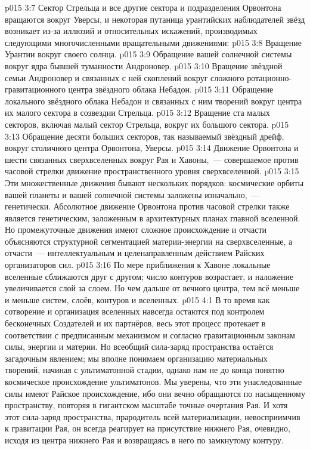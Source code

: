 \vs p015 3:7 \pc Сектор Стрельца и все другие сектора и подразделения Орвонтона вращаются вокруг Уверсы, и некоторая путаница урантийских наблюдателей звёзд возникает из\hyp{}за иллюзий и относительных искажений, производимых следующими многочисленными вращательными движениями:
\vs p015 3:8 Вращение Урантии вокруг своего солнца.
\vs p015 3:9 Обращение вашей солнечной системы вокруг ядра бывшей туманности Андроновер.
\vs p015 3:10 Вращение звёздной семьи Андроновер и связанных с ней скоплений вокруг сложного ротационно\hyp{}гравитационного центра звёздного облака Небадон.
\vs p015 3:11 Обращение локального звёздного облака Небадон и связанных с ним творений вокруг центра их малого сектора в созвездии Стрельца.
\vs p015 3:12 Вращение ста малых секторов, включая малый сектор Стрельца, вокруг их большого сектора.
\vs p015 3:13 Обращение десяти больших секторов, так называемый звёздный дрейф, вокруг столичного центра Орвонтона, Уверсы.
\vs p015 3:14 Движение Орвонтона и шести связанных сверхвселенных вокруг Рая и Хавоны,~--- совершаемое против часовой стрелки движение пространственного уровня сверхвселенной.
\vs p015 3:15 \pc Эти множественные движения бывают нескольких порядков: космические орбиты вашей планеты и вашей солнечной системы заложены изначально,~--- генетически. Абсолютное движение Орвонтона против часовой стрелки также является генетическим, заложенным в архитектурных планах главной вселенной. Но промежуточные движения имеют сложное происхождение и отчасти объясняются структурной сегментацией материи\hyp{}энергии на сверхвселенные, а отчасти~--- интеллектуальным и целенаправленным действием Райских организаторов сил.
\vs p015 3:16 \pc По мере приближения к Хавоне локальные вселенные сближаются друг с другом; число контуров возрастает, и наложение увеличивается слой за слоем. Но чем дальше от вечного центра, тем всё меньше и меньше систем, слоёв, контуров и вселенных.
\vs p015 4:1 В то время как сотворение и организация вселенных навсегда остаются под контролем бесконечных Создателей и их партнёров, весь этот процесс протекает в соответствии с предписанным механизмом и согласно гравитационным законам силы, энергии и материи. Но всеобщий сила\hyp{}заряд пространства остаётся загадочным явлением; мы вполне понимаем организацию материальных творений, начиная с ультиматонной стадии, однако нам не до конца понятно космическое происхождение ультиматонов. Мы уверены, что эти унаследованные силы имеют Райское происхождение, ибо они вечно обращаются по насыщенному пространству, повторяя в гигантском масштабе точные очертания Рая. И хотя этот сила\hyp{}заряд пространства, прародитель всей материализации, невосприимчив к гравитации Рая, он всегда реагирует на присутствие нижнего Рая, очевидно, исходя из центра нижнего Рая и возвращаясь в него по замкнутому контуру.
